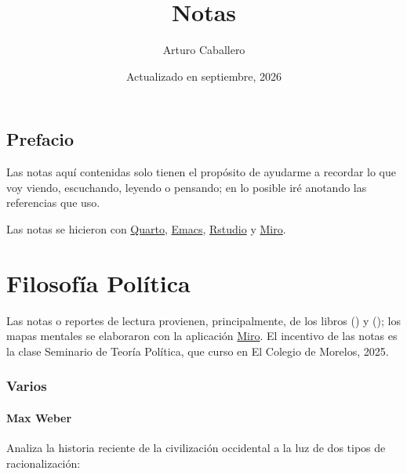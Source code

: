 \documentclass[
  letterpaper,
  DIV=11,
  numbers=noendperiod]{scrreprt}
\title{Notas}
\author{Arturo Caballero}
\date{Actualizado en septiembre, 2026}
\renewcommand*\contentsname{Tabla de contenidos}
\newcommand\contentsname{Tabla de contenidos}
\begin{document}
\maketitle

\renewcommand*\contentsname{Contenido}
{
\hypersetup{linkcolor=}
\setcounter{tocdepth}{2}
\tableofcontents
}


\chapter*{Prefacio}\label{prefacio}


Las notas aquí contenidas solo tienen el propósito de ayudarme a
recordar lo que voy viendo, escuchando, leyendo o pensando; en lo
posible iré anotando las referencias que uso.

Las notas se hicieron con \href{https://quarto.org/docs/books}{Quarto},
\href{https://www.gnu.org/software/emacs/}{Emacs},
\href{https://posit.co/download/rstudio-desktop/}{Rstudio} y
\href{https://miro.com/es/}{Miro}.

\part{Filosofía Política}

Las notas o reportes de lectura provienen, principalmente, de los libros
() y
(); los mapas mentales
se elaboraron con la aplicación \href{https://miro.com/es/}{Miro}. El
incentivo de las notas es la clase Seminario de Teoría Política, que
curso en El Colegio de Morelos, 2025.

\section*{Varios}\label{varios}


\subsection*{Max Weber}\label{max-weber}

Analiza la historia reciente de la civilización occidental a la luz de
dos tipos de racionalización:
\end{document}
